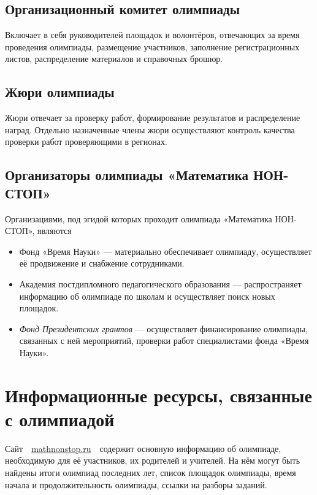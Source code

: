 \documentclass[a4paper,12pt]{article}
\newcommand{\mns}{«Математика НОН-СТОП»\xspace}
\begin{document}
\subsection{Организационный комитет олимпиады}

Включает в себя руководителей площадок и волонтёров, отвечающих за время проведения олимпиады, размещение участников, заполнение регистрационных листов, распределение материалов и справочных брошюр.

\subsection{Жюри олимпиады}

Жюри отвечает за проверку работ, формирование результатов и распределение наград.
Отдельно назначенные члены жюри осуществляют контроль качества проверки работ проверяющими в регионах.

\subsection{Организаторы олимпиады \mns}

Организациями, под эгидой которых проходит олимпиада \mns, являются \vspace{-4mm}

\begin{itemize}
\item Фонд «Время Науки» — материально обеспечивает олимпиаду, осуществляет её продвижение и снабжение сотрудниками.

\item Академия постдипломного педагогического образования — распространяет информацию об олимпиаде по школам и осуществляет поиск новых площадок.

\item {\itshape Фонд Президентских грантов} — осуществляет финансирование олимпиады, связанных с ней мероприятий, проверки работ специалистами фонда «Время Науки».
\end{itemize}

\section{Информационные ресурсы, связанные с олимпиадой}

Сайт\ \ \url{mathnonstop.ru}\ \ содержит основную информацию об олимпиаде, необходимую для её участников, их родителей и учителей. На нём могут быть найдены итоги олимпиад последних лет, список площадок олимпиады, время начала и продолжительность олимпиады, ссылки на разборы заданий.
\end{document}
